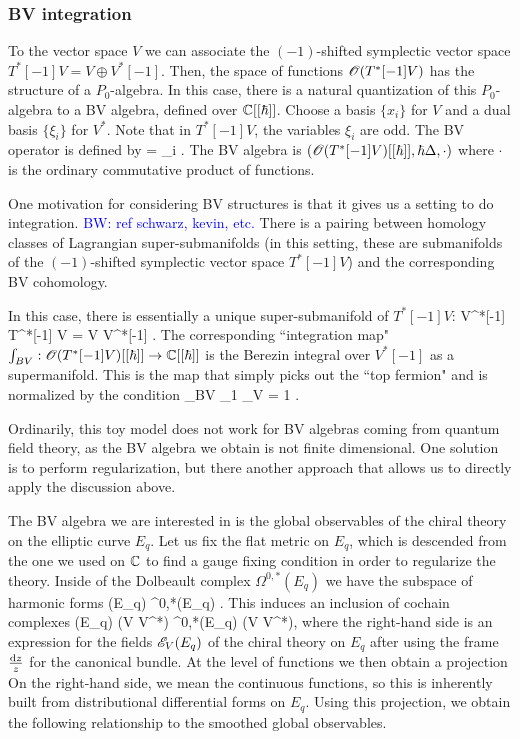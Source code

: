 \documentclass[10pt]{amsart}
\def\brian{\textcolor{blue}{BW: }\textcolor{blue}}
\begin{document}
\subsubsection{BV integration}

To the vector space $V$ we can associate the $(-1)$-shifted symplectic vector space $T^*[-1] V = V \oplus V^*[-1]$. 
Then, the space of functions $\mathscr O(T^*[-1]V)$ has the structure of a $P_0$-algebra. 
In this case, there is a natural quantization of this $P_0$-algebra to a BV algebra, defined over $\mathbb C[[\hbar]]$. 
Choose a basis $\{x_i\}$ for $V$ and a dual basis $\{\xi_i\}$ for $V^*$. 
Note that in $T^*[-1] V$, the variables $\xi_i$ are odd.
The BV operator is defined by
\ben
\Delta = \sum_i   .
\een 
The BV algebra is $(\mathscr O(T^*[-1]V)[[\hbar]], \hbar \Delta, \cdot)$ where $\cdot$ is the ordinary commutative product of functions. 

One motivation for considering BV structures is that it gives us a setting to do integration. \brian{ref schwarz, kevin, etc.}
There is a pairing between homology classes of Lagrangian super-submanifolds (in this setting, these are submanifolds of the $(-1)$-shifted symplectic vector space $T^*[-1] V$) and the corresponding BV cohomology. 

In this case, there is essentially a unique super-submanifold of $T^*[-1] V$:
\ben
V^*[-1] \subset T^*[-1] V = V \oplus V^*[-1] .
\een 
The corresponding ``integration map" $\int_{BV} : \mathscr O(T^*[-1]V)[[\hbar]] \to \mathbb C[[\hbar]]$ is the Berezin integral over $V^*[-1]$ as a supermanifold.
This is the map that simply picks out the ``top fermion" and is normalized by the condition
\ben
\int_{BV} \xi_1 \cdots \xi_{\dim V} = 1 .
\een

Ordinarily, this toy model does not work for BV algebras coming from quantum field theory, as the BV algebra we obtain is not finite dimensional. 
One solution is to perform regularization, but there another approach that allows us to directly apply the discussion above. 

The BV algebra we are interested in is the global observables of the chiral theory on the elliptic curve $E_q$.
Let us fix the flat metric on $E_q$, which is descended from the one we used on $\mathbb C$ to find a gauge fixing condition in order to regularize the theory. 
Inside of the Dolbeault complex $\Omega^{0,*}(E_q)$ we have the subspace of harmonic forms
\ben
\sH(E_q) \subset \Omega^{0,*}(E_q) .
\een 
This induces an inclusion of cochain complexes
\be\label{harmonics}
\sH(E_q) \tensor (V \oplus {} V^*) \hookrightarrow \Omega^{0,*}(E_q) \tensor (V \oplus {} V^*),
\ee
where the right-hand side is an expression for the fields $\mathscr E_V(E_q)$ of the chiral theory on $E_q$ after using the frame $\frac{{\rm d} z}{z}$ for the canonical bundle. 
At the level of functions we then obtain a projection
\ben
{}
\een
On the right-hand side, we mean the continuous functions, so this is inherently built from distributional differential forms on $E_q$. 
Using this projection, we obtain the following relationship to the smoothed global observables.
\end{document}
